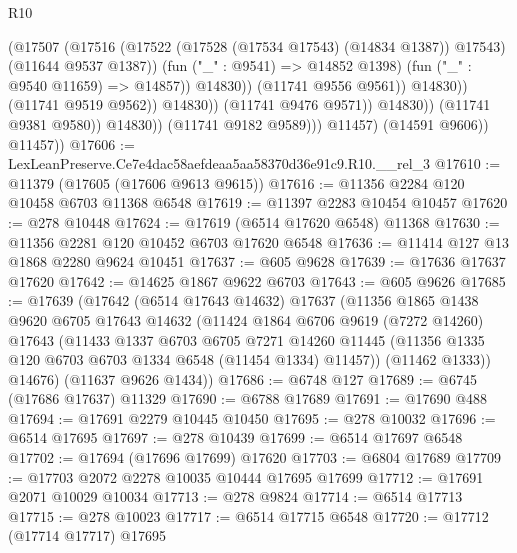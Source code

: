 \begin{lexlean}{R10}
\begin{coremodule}
                                            (@17507
                                              (@17516
                                                (@17522
                                                  (@17528 (@17534 @17543) (@14834 @1387))
                                                  @17543)
                                                (@11644 @9537 @1387))
                                              (fun ("_" : @9541) => @14852 @1398)
                                              (fun ("_" : @9540 @11659) => @14857))
                                            @14830))
                                        (@11741 @9556 @9561))
                                      @14830))
                                  (@11741 @9519 @9562))
                                @14830))
                            (@11741 @9476 @9571))
                          @14830))
                      (@11741 @9381 @9580))
                    @14830))
                (@11741 @9182 @9589)))
            @11457)
          (@14591 @9606))
        @11457))
@17606 := LexLeanPreserve.Ce7e4dac58aefdeaa5aa58370d36e91c9.R10.__rel_3
@17610 := @11379 (@17605 (@17606 @9613 @9615))
@17616 := @11356 @2284 @120 @10458 @6703 @11368 @6548
@17619 := @11397 @2283 @10454 @10457
@17620 := @278 @10448
@17624 := @17619 (@6514 @17620 @6548) @11368
@17630 := @11356 @2281 @120 @10452 @6703 @17620 @6548
@17636 := @11414 @127 @13 @1868 @2280 @9624 @10451
@17637 := @605 @9628
@17639 := @17636 @17637 @17620
@17642 := @14625 @1867 @9622 @6703
@17643 := @605 @9626
@17685 := @17639
    (@17642
      (@6514 @17643 @14632)
      @17637
      (@11356
        @1865
        @1438
        @9620
        @6705
        @17643
        @14632
        (@11424
          @1864
          @6706
          @9619
          (@7272 @14260)
          @17643
          (@11433
            @1337
            @6703
            @6705
            @7271
            @14260
            @11445
            (@11356 @1335 @120 @6703 @6703 @1334 @6548 (@11454 @1334) @11457))
          (@11462 @1333))
        @14676)
      (@11637 @9626 @1434))
@17686 := @6748 @127
@17689 := @6745 (@17686 @17637) @11329
@17690 := @6788 @17689
@17691 := @17690 @488
@17694 := @17691 @2279 @10445 @10450
@17695 := @278 @10032
@17696 := @6514 @17695
@17697 := @278 @10439
@17699 := @6514 @17697 @6548
@17702 := @17694 (@17696 @17699) @17620
@17703 := @6804 @17689
@17709 := @17703 @2072 @2278 @10035 @10444 @17695 @17699
@17712 := @17691 @2071 @10029 @10034
@17713 := @278 @9824
@17714 := @6514 @17713
@17715 := @278 @10023
@17717 := @6514 @17715 @6548
@17720 := @17712 (@17714 @17717) @17695

\end{coremodule}
\end{lexlean}
